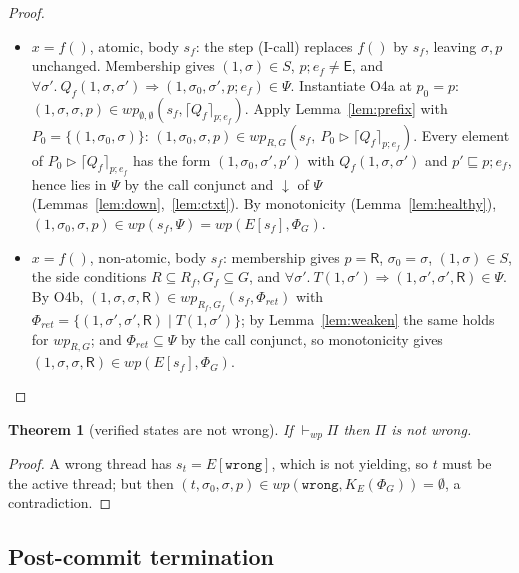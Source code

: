 \documentclass[11pt]{article}
\theoremstyle{plain}
\newtheorem{theorem}{Theorem}
\theoremstyle{plain}
\theoremstyle{definition}
\newcommand{\MR}{\mathsf{R}}
\newcommand{\ME}{\mathsf{E}}
\newcommand{\sq}{\sqsubseteq}
\newcommand{\wpx}{\mathit{wp}}
\newcommand{\upemb}[2]{\lceil #1\rceil_{#2}}     %
\newcommand{\vdashwp}{\vdash_{\mathit{wp}}}
\newcommand{\dcl}{\ensuremath{\downarrow}\text{-closed}}
\newcommand{\anchorshift}{\triangleright}
\newcommand{\twrong}{\mathtt{wrong}}
\begin{document}
\begin{proof}
\begin{itemize}[leftmargin=1.4em]
  from $(1,\sigma_0,\sigma)\in G$ and O3, $(u,\sigma_0,\sigma)\in R^*$, so
  Lemma~\ref{lem:yield} moves $u$ from anchor $\sigma_0$ to anchor $\sigma$.
  Definition~\ref{def:istate} holds with active thread 1 and anchor $\sigma$.
\item $x=f()$, atomic, body $s_f$: the step (I-call) replaces $f()$ by $s_f$,
  leaving $\sigma,p$ unchanged. Membership gives $(1,\sigma)\in S$,
  $p;e_f\neq\ME$, and
  $\forall\sigma'.\ Q_f(1,\sigma,\sigma')\Rightarrow(1,\sigma_0,\sigma',p;e_f)\in\Psi$.
  Instantiate O4a at $p_0 = p$:
  $(1,\sigma,\sigma,p)\in\wpx_{\emptyset,\emptyset}(s_f,\upemb{Q_f}{p;e_f})$. Apply
  Lemma~\ref{lem:prefix} with $P_0=\{(1,\sigma_0,\sigma)\}$:
  $(1,\sigma_0,\sigma,p)\in\wpx_{R,G}(s_f,\ P_0\anchorshift\upemb{Q_f}{p;e_f})$.
  Every element of $P_0\anchorshift\upemb{Q_f}{p;e_f}$ has the form
  $(1,\sigma_0,\sigma',p')$ with $Q_f(1,\sigma,\sigma')$ and $p'\sq p;e_f$, hence
  lies in $\Psi$ by the call conjunct and \dcl{} of $\Psi$
  (Lemmas~\ref{lem:down},~\ref{lem:ctxt}). By monotonicity
  (Lemma~\ref{lem:healthy}), $(1,\sigma_0,\sigma,p)\in\wpx(s_f,\Psi) = \wpx(E[s_f],\Phi_G)$.
\item $x=f()$, non-atomic, body $s_f$: membership gives $p=\MR$, $\sigma_0=\sigma$,
  $(1,\sigma)\in S$, the side conditions $R\subseteq R_f, G_f\subseteq G$, and
  $\forall\sigma'.\ T(1,\sigma')\Rightarrow(1,\sigma',\sigma',\MR)\in\Psi$. By O4b,
  $(1,\sigma,\sigma,\MR)\in\wpx_{R_f,G_f}(s_f,\Phi_{\mathit{ret}})$ with
  $\Phi_{\mathit{ret}}=\{(1,\sigma',\sigma',\MR)\mid T(1,\sigma')\}$; by
  Lemma~\ref{lem:weaken} the same holds for $\wpx_{R,G}$; and
  $\Phi_{\mathit{ret}}\subseteq\Psi$ by the call conjunct, so monotonicity gives
  $(1,\sigma,\sigma,\MR)\in\wpx(E[s_f],\Phi_G)$.\qedhere
\end{itemize}
\end{proof}

\begin{theorem}[verified states are not wrong]\label{thm:notwrong}
If $\vdashwp\Pi$ then $\Pi$ is not wrong.
\end{theorem}
\begin{proof}
A wrong thread has $s_t = E[\twrong]$, which is not yielding, so $t$ must be the
active thread; but then
$(t,\sigma_0,\sigma,p)\in\wpx(\twrong,K_E(\Phi_G))=\emptyset$, a contradiction.
\end{proof}

\subsection{Post-commit termination}
\end{document}
